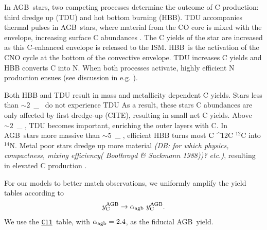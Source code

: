 \documentclass[fleqn,
usenatbib]{mnras}
\makeatletter
\newcommand{\cxi}{\texttt{\hyperlink{C11}{C11}}}
\newcommand{\cfactor}{2.4}
\newcommand{\agb}{AGB}
\newcommand{\C}[1][\@nil]{
    \def\tmp{#1}%
    \ifx\tmp\@nnil%
        \ensuremath{\rm C}%
    \else%
        \ifmmode ^{#1}{\rm C}%
        \else $^{#1}$C%
        \fi%
\fi }
\newcommand{\Ycagb}{\ensuremath{y_{\rm C}^{\rm AGB}}}
\newcommand{\Mo}{%
    \ifmmode {\rm M}_{\sun}%
    \else {M$_{\sun}$}%
    \fi}
\newcommand{\about}[1]{${\sim} #1$}
\newcommand{\dbnote}[1]{{\color{Thistle} \textit{\small (DB: #1)}}}
\makeatother
\begin{document}
In \agb\ stars, two competing processes determine the outcome of C production: {third dredge up} (TDU) and {hot bottom burning} (HBB).  
TDU accompanies thermal pulses in \agb\ stars, where material from the CO core is mixed with the envelope, increasing surface C abundances \citep{KL14}. The C yields of the star are increased as this C-enhanced envelope is released to the ISM. 
HBB\ is the activation of the CNO cycle at the bottom of the convective envelope. 
TDU increases C yields and HBB converts C into N. When both processes activate, highly efficient N production ensues (see discussion in e.g. \citealt{james+23, ventura+13}). 



Both HBB and TDU result in mass and metallicity dependent C yields. 
Stars less than \about{2}\,\Mo\ do not experience TDU As a result, these stars C abundances are only affected by first dredge-up (CITE), resulting in small net C yields.
Above \about{2}\,\Mo{}, TDU becomes important, enriching the outer layers with C.
In \agb\ stars more massive than \about{5}\,\Mo, efficient HBB turns most \C[12] into $^{14}$N.
Metal poor stars dredge up more material \dbnote{for which physics, compactness, mixing efficiency( Boothroyd \& Sackmann 1988))? etc.}, resulting in elevated C production \citep{ventura+13}.

For our models to better match observations, we uniformly amplify the yield tables according to
\begin{equation} \label{eq:alpha}
        \Ycagb \rightarrow \alpha_{\rm agb}\ \Ycagb.
\end{equation}
We use the \cxi\ table, with $\alpha_{\rm agb}=\cfactor$, as the fiducial \agb\ yield.
\end{document}
